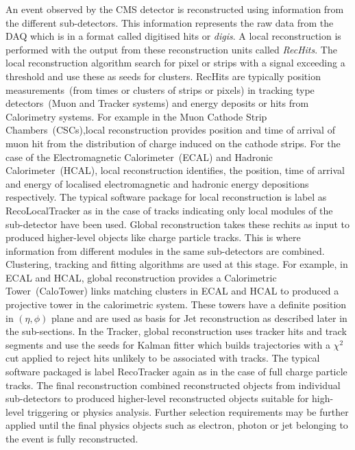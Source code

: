 An event observed by the CMS detector is reconstructed using information from the different sub-detectors. This information represents the raw data from the DAQ which is in a format called digitised hits or \textit{digis}. A local reconstruction is performed with the output from these reconstruction units called \textit{RecHits}. The local reconstruction algorithm search for pixel or strips with a signal exceeding a threshold  and use these as seeds for clusters. RecHits are typically position measurements~(from times or clusters of strips or pixels) in tracking type detectors~(Muon and Tracker systems) and energy deposits or hits from Calorimetry systems. For example in the Muon Cathode Strip Chambers~(CSCs),local reconstruction provides position and time of arrival of muon hit from the distribution of charge induced on the cathode strips. For  the case of the Electromagnetic Calorimeter~(ECAL) and Hadronic Calorimeter~(HCAL), local reconstruction identifies, the position, time of arrival and energy of localised electromagnetic and hadronic energy depositions respectively. The typical software package for local reconstruction is label as RecoLocalTracker as in the case of tracks indicating only local modules of the sub-detector have been used. Global reconstruction takes these rechits as input to produced higher-level objects like charge particle tracks. This is where information from different modules in the same sub-detectors are combined. Clustering, tracking and fitting algorithms are used at this stage. For example, in ECAL and HCAL, global reconstruction provides a Calorimetric Tower~(CaloTower) links matching clusters in ECAL and HCAL   to produced a projective tower in the calorimetric system.  These towers have a definite position in $(\eta, \phi)$ plane and are used as basis for Jet reconstruction as described later in the sub-sections. In the Tracker, global reconstruction uses tracker hits and track segments and use the seeds for Kalman fitter which builds trajectories  with a $\chi^{2}$ cut applied to reject hits unlikely to be associated with tracks. The typical software packaged is label RecoTracker again as in the case of full charge particle tracks. The final reconstruction combined reconstructed objects from individual sub-detectors to produced  higher-level reconstructed objects  suitable for high-level triggering or physics analysis. Further selection requirements may be further applied until the final physics objects such as electron, photon or jet belonging to the event is fully reconstructed.
